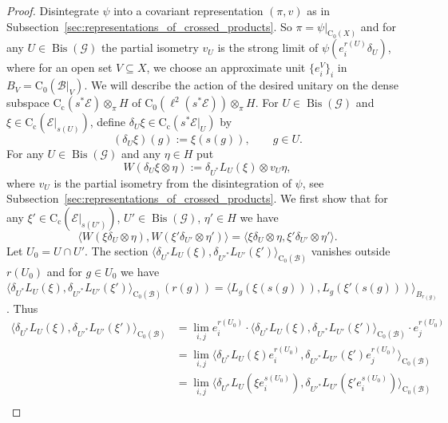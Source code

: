 \documentclass[11 pt, leqno]{amsart}
\numberwithin{equation}{section}
\theoremstyle{plain}
\theoremstyle{definition}
\newcommand*{\contc}{\mathrm{C_c}}%
\newcommand*{\contz}{\mathrm{C_0}}%
\DeclareMathOperator{\Bis}{Bis}
\newcommand{\B}{\mathcal B}
\newcommand{\G}{\mathcal G} %
\newcommand{\EE}{\mathcal E}
\begin{document}
\begin{proof} 
Disintegrate $\psi$ into a covariant representation $(\pi,v)$ as in Subsection~\ref{sec:representations_of_crossed_products}. 
So $\pi = \psi|_{\contz(X)}$ and for any $U\in\Bis(\G)$ the partial isometry $v_{U}$ is the strong limit of $\psi(e^{r(U)}_i\delta_{U})$, where for an open set $V\subseteq X$, we choose an approximate unit $\{e^V_i\}_i$ in $ B_{V}=\contz(\B|_{V})$.
We will describe the action of the desired unitary on the dense subspace $\contc(s^*\EE)\otimes_{\pi} H$ of $\contz(\ell^2(s^*\EE))\otimes_{\pi}H$.
For $U\in\Bis(\G)$ and $\xi \in \contc(\EE|_{s(U)})$, define  $\delta_U \xi \in \contc(s^*\EE|_U)$ by 
\[
    (\delta_U \xi)(g) := \xi(s(g)) , \qquad g\in U .
\]
For any $U\in \Bis(\G)$ and any $\eta\in H$ put
\begin{equation}\label{eq:unitary_for_Fell_absorption_II}
    W (\delta_U \xi \otimes \eta):=\delta_{U^*}L_{U}(\xi) \otimes v_U\eta,
\end{equation}
where $v_U$ is the partial isometry from the disintegration of $\psi$, see Subsection~\ref{sec:representations_of_crossed_products}.
We first show that for any $\xi'\in \contc(\EE|_{s(U')})$, $U'\in\Bis(\G)$, $\eta'\in H$ we have
\begin{equation}\label{eq:inner_product_preserve_Fell}
    \langle W (\xi \delta_U\otimes \eta),  W (\xi' \delta_{U'}\otimes \eta')\rangle = \langle  \xi \delta_U\otimes \eta,  \xi' \delta_{U'}\otimes \eta'\rangle. 
\end{equation}
Let $U_0=U\cap U'$. 
The section $\langle \delta_{U^*} L_{U}(\xi) , \delta_{U'^*}L_{U'}(\xi') \rangle_{\contz(\B)}$ vanishes outside $r(U_0)$ and for $g\in U_0$ we have $\langle  \delta_{U^*}L_{U}(\xi), \delta_{U'^*}L_{U'}(\xi') \rangle_{\contz(\B)}(r(g))=\langle L_g(\xi(s(g))), L_g(\xi'(s(g)))\rangle_{B_{r(g)}}$. 
Thus %
\[
\begin{split}
    \langle \delta_{U^*}L_{U}(\xi) , \delta_{U'^*}L_{U'}(\xi') \rangle_{\contz(\B)} &= \lim_{i,j} e_{i}^{r(U_0)}\cdot\langle \delta_{U^*}L_{U}(\xi) ,  \delta_{U'^*}L_{U'}(\xi')\rangle_{\contz(\B)}\cdot e_{j}^{r(U_0)} \\
        &= \lim_{i,j} \langle \delta_{U^*}L_{U}(\xi) e_{i}^{r(U_0)}, \delta_{U'^*}L_{U'}(\xi')  e_{j}^{r(U_0)}\rangle_{\contz(\B)} \\
        &= \lim_{i,j} \langle \delta_{U^*}L_{U}(\xi e_{i}^{s(U_0)}) , \delta_{U'^*}L_{U'}(\xi' e_{i}^{s(U_0)}) \rangle_{\contz(\B)} \\

\end{split}\]
\end{proof}
\end{document}
